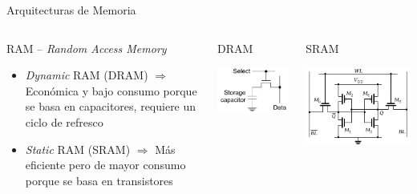 \begin{frame}{Arquitecturas de Memoria}
    \begin{columns}
        \begin{block}{RAM -- \emph{Random Access Memory}}
            \begin{itemize}
                \item \emph{Dynamic} RAM (DRAM) $\Rightarrow$ Económica y bajo consumo porque se basa en capacitores, requiere un ciclo de refresco
                \item \emph{Static} RAM (SRAM) $\Rightarrow$ Más eficiente pero de mayor consumo porque se basa en transistores
            \end{itemize}
        \end{block}
        \begin{block}{DRAM}
            \begin{center}
                \includegraphics[width=.9\linewidth]{../imagenes/dram}
            \end{center}
        \end{block}
        \begin{block}{SRAM}
            \begin{center}
                \includegraphics[width=.9\linewidth]{../imagenes/sram}
            \end{center}
        \end{block}
    \end{columns}
\end{frame}

